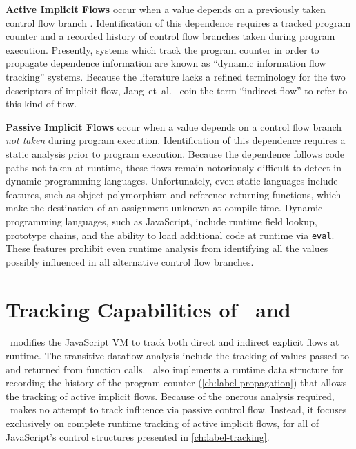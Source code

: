 \begin{description}
\item{
\textbf{Active Implicit Flows} occur when a value depends on a previously taken control flow branch .
Identification of this dependence requires a tracked program counter and a recorded history of control flow branches taken during program execution.
Presently, systems which track the program counter in order to propagate dependence information are known as ``dynamic information flow tracking'' systems.
Because the literature lacks a refined terminology for the two descriptors of implicit flow, Jang~et~al.~\cite{jang.etal+10} coin the term ``indirect flow'' to refer to this kind of flow.
}

\item{
\textbf{Passive Implicit Flows} occur when a value depends on a control flow branch \emph{not taken} during program execution.
Identification of this dependence requires a static analysis prior to program execution.
Because the dependence follows code paths not taken at runtime, these flows remain notoriously difficult to detect in dynamic programming languages.
Unfortunately, even static languages include features, such as object polymorphism and reference returning functions, which make the destination of an assignment unknown at compile time.
Dynamic programming languages, such as JavaScript, include runtime field lookup, prototype chains, and the ability to load additional code at runtime via \texttt{eval}.
These features prohibit even runtime analysis from identifying all the values possibly influenced in all alternative control flow branches.
}

\end{description}

\section{Tracking Capabilities of \FlowCore\ and \JitFlow}
\label{sec:tracking-capabilities}

\FlowCore\ modifies the JavaScript VM to track both direct and indirect explicit flows at runtime.
The transitive dataflow analysis include the tracking of values passed to and returned from function calls.
\FlowCore\ also implements a runtime data structure for recording the history of the program counter (\autoref{ch:label-propagation}) that allows the tracking of active implicit flows.
Because of the onerous analysis required, \FlowCore\ makes no attempt to track influence via passive control flow.
Instead, it focuses exclusively on complete runtime tracking of active implicit flows, for all of JavaScript's control structures presented in \autoref{ch:label-tracking}.
